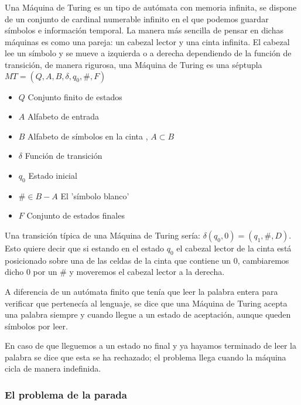 Una Máquina de Turing es un tipo de autómata con memoria infinita, se dispone de un conjunto de cardinal numerable infinito en el que podemos guardar símbolos e información temporal. La manera más sencilla de pensar en dichas máquinas es como una pareja: un cabezal lector y una cinta infinita. El cabezal lee un símbolo y se mueve a izquierda o a derecha dependiendo de la función de transición, de manera rigurosa, una Máquina de Turing es una séptupla $MT=(Q,A,B,\delta,q_0,\#,F)$


\begin{multicols}{2}
	\begin{itemize}
		\item $Q$  Conjunto finito de estados
		\item $A$  Alfabeto de entrada
		\item $B$  Alfabeto de símbolos en la cinta , $A\subset B$
		\item $\delta$ Función de transición
		\item $q_0$ Estado inicial
		\item $\# \in B-A$ El 'símbolo blanco'
		\item $F$ Conjunto de estados finales
	\end{itemize}
\end{multicols}


 Una transición típica de una Máquina de Turing sería: $\delta(q_0,0)=(q_1,\#,D)$. Esto quiere decir que si estando en el estado $q_0$ el cabezal lector de la cinta está posicionado sobre una de las celdas de la cinta que contiene un 0, cambiaremos dicho 0 por un $\#$ y moveremos el cabezal lector a la derecha.

 \vspace{10px}

 A diferencia de un autómata finito que tenía que leer la palabra entera para verificar que pertenecía al lenguaje, se dice que una Máquina de Turing acepta una palabra siempre y cuando llegue a un estado de aceptación, aunque queden símbolos por leer.

 \vspace{10px}

 En caso de que lleguemos a un estado no final y ya hayamos terminado de leer la palabra se dice que esta se ha rechazado; el problema llega cuando la máquina cicla de manera indefinida.


\subsubsection{El problema de la parada}


